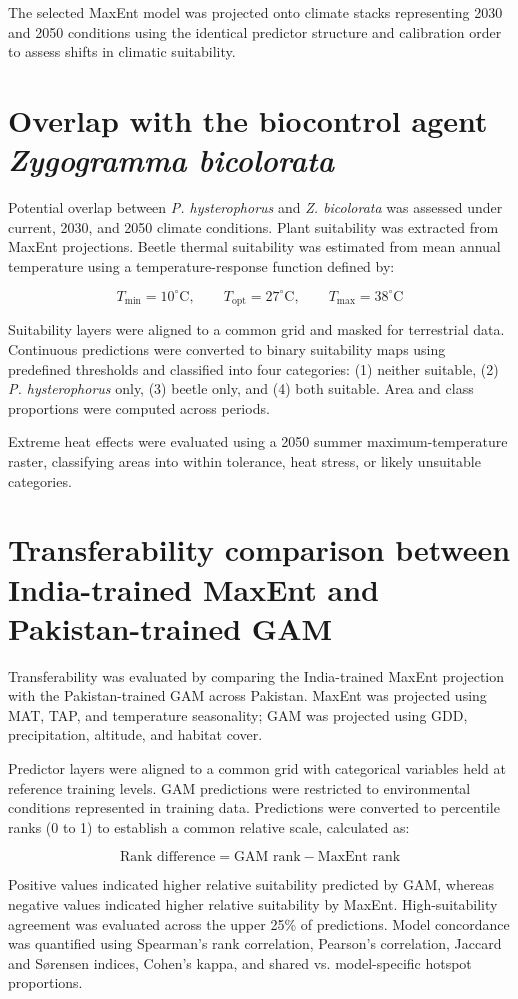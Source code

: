 The selected MaxEnt model was projected onto climate stacks representing 2030 and 2050 conditions using the identical predictor structure and calibration order to assess shifts in climatic suitability.

\section{Overlap with the biocontrol agent \textit{Zygogramma bicolorata}}

Potential overlap between \textit{P. hysterophorus} and \textit{Z. bicolorata} was assessed under current, 2030, and 2050 climate conditions. Plant suitability was extracted from MaxEnt projections. Beetle thermal suitability was estimated from mean annual temperature using a temperature-response function defined by:

$$
T_{\min} = 10^{\circ}\mathrm{C}, \qquad T_{\mathrm{opt}} = 27^{\circ}\mathrm{C}, \qquad T_{\max} = 38^{\circ}\mathrm{C}
$$

Suitability layers were aligned to a common grid and masked for terrestrial data. Continuous predictions were converted to binary suitability maps using predefined thresholds and classified into four categories: (1) neither suitable, (2) \textit{P. hysterophorus} only, (3) beetle only, and (4) both suitable. Area and class proportions were computed across periods.

Extreme heat effects were evaluated using a 2050 summer maximum-temperature raster, classifying areas into within tolerance, heat stress, or likely unsuitable categories.

\section{Transferability comparison between India-trained MaxEnt and Pakistan-trained GAM}

Transferability was evaluated by comparing the India-trained MaxEnt projection with the Pakistan-trained GAM across Pakistan. MaxEnt was projected using MAT, TAP, and temperature seasonality; GAM was projected using GDD, precipitation, altitude, and habitat cover.

Predictor layers were aligned to a common grid with categorical variables held at reference training levels. GAM predictions were restricted to environmental conditions represented in training data. Predictions were converted to percentile ranks (0 to 1) to establish a common relative scale, calculated as:

$$
\text{Rank difference} = \text{GAM rank} - \text{MaxEnt rank}
$$

Positive values indicated higher relative suitability predicted by GAM, whereas negative values indicated higher relative suitability by MaxEnt. High-suitability agreement was evaluated across the upper 25\% of predictions. Model concordance was quantified using Spearman's rank correlation, Pearson's correlation, Jaccard and S{\o}rensen indices, Cohen's kappa, and shared vs. model-specific hotspot proportions.
